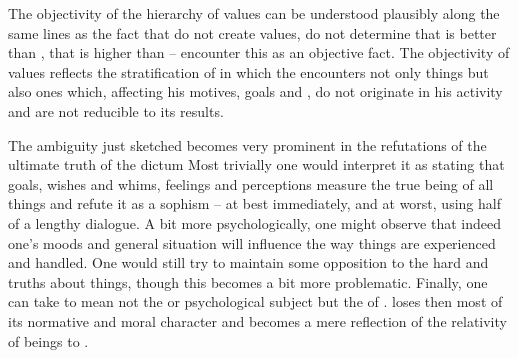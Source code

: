 %
The {objectivity} of the hierarchy of values can be understood plausibly along
the same lines as the fact that  do not create values,  do not
determine that  is better than , that  is higher
than  --  encounter this as an {objective} fact.  The objectivity of values
reflects the stratification of  in which the 
encounters not only  things but also ones which, affecting his
motives, goals and , do not originate in his activity and are not
reducible to its results.

\label{pa:SelfEgo} The ambiguity just sketched becomes very
prominent in the refutations of the ultimate
truth of the dictum   Most trivially one
would interpret it as stating that  goals, wishes and whims,
feelings and perceptions measure the true being of all things and refute it as a
sophism -- at best immediately, and at worst, using half of a lengthy
dialogue. A
bit more psychologically, one might observe that indeed one's moods and general
situation will influence the way things are experienced and handled. One would
still try to maintain some opposition to the hard and 
truths about things, though this becomes a bit more problematic.  Finally, one
can take  to mean not the  or psychological subject but the
 of .  loses then most of its
normative and moral character and becomes a mere reflection of the relativity of
beings to .
  
